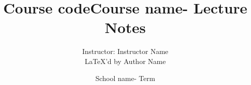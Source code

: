 \documentclass[11pt]{article}
\def\instructorname{Instructor Name}
\def\authorname{Author Name}
\def\term{Term}
\def\coursecode{Course code}
\def\coursename{Course name}
\def\schoolname{School name}
\begin{document}
\thispagestyle{empty}
\title{\coursecode\space\coursename\space - Lecture Notes}
\author{Instructor: \instructorname \\ \LaTeX'd by \authorname}
\date{\schoolname\space- \term}
\maketitle
\pagebreak

\tableofcontents
\pagebreak

\end{document}
